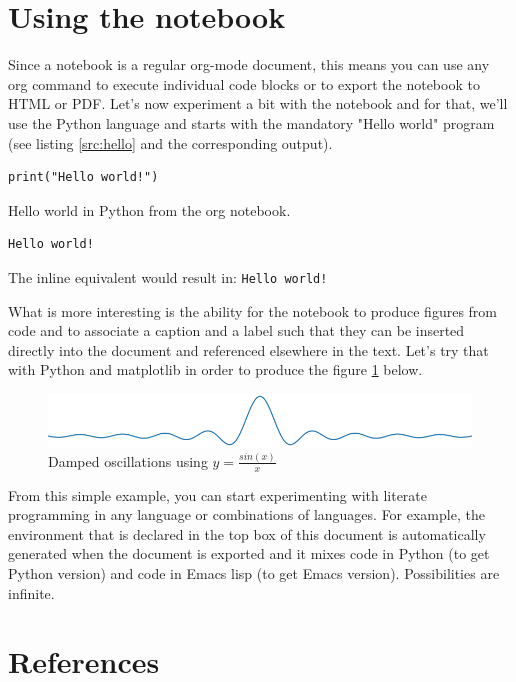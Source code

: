 \documentclass[11pt]{article}
\begin{document}
\section*{Using the notebook}
\label{sec:org7f94eec}

Since a notebook is a regular org-mode document, this means you can use any org command to execute individual code blocks or to export the notebook to HTML or PDF. Let's now experiment a bit with the notebook and for that, we'll use the Python language and starts with the mandatory "Hello world" program (see listing \ref{src:hello} and the corresponding output).

\begin{listing}[htbp]
\begin{verbatim}
print("Hello world!")
\end{verbatim}
\caption{\label{src:hello}Hello world in Python from the org notebook.}
\end{listing}
\begin{verbatim}
Hello world!
\end{verbatim}

The inline equivalent would result in: \texttt{Hello world!}

What is more interesting is the ability for the notebook to produce figures from code and to associate a caption and a label such that they can be inserted directly into the document and referenced elsewhere in the text. Let's try that with Python and matplotlib in order to produce the figure \ref{fig:oscillations} below.

\begin{figure}[htbp]
\centering
\includegraphics[width=.9\linewidth]{oscillations.png}
\caption{\label{fig:oscillations}Damped oscillations using \(y=\frac{sin(x)}{x}\)}
\end{figure}

From this simple example, you can start experimenting with literate
programming in any language or combinations of languages. For
example, the environment that is declared in the top box of this
document is automatically generated when the document is exported and it mixes code in Python (to get Python version) and code in Emacs lisp (to get Emacs version). Possibilities are infinite.

\section*{References}
\label{sec:orgc37d672}
\end{document}
